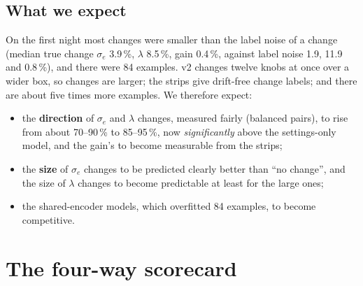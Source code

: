 \documentclass[11pt]{article}
\begin{document}
\subsection{What we expect}
On the first night most changes were smaller than the label noise of a change (median true change $\sigma_e$ 3.9\,\%,
$\lambda$ 8.5\,\%, gain 0.4\,\%, against label noise 1.9, 11.9 and 0.8\,\%), and there were 84 examples. v2 changes
twelve knobs at once over a wider box, so changes are larger; the strips give drift-free change labels; and there are
about five times more examples. We therefore expect:
\begin{itemize}
\item the \textbf{direction} of $\sigma_e$ and $\lambda$ changes, measured fairly (balanced pairs), to rise from about
  70--90\,\% to 85--95\,\%, now \emph{significantly} above the settings-only model, and the gain's to become measurable
  from the strips;
\item the \textbf{size} of $\sigma_e$ changes to be predicted clearly better than ``no change'', and the size of
  $\lambda$ changes to become predictable at least for the large ones;
\item the shared-encoder models, which overfitted 84 examples, to become competitive.
\end{itemize}



\section{The four-way scorecard}\label{sec:scorecard}
\end{document}
